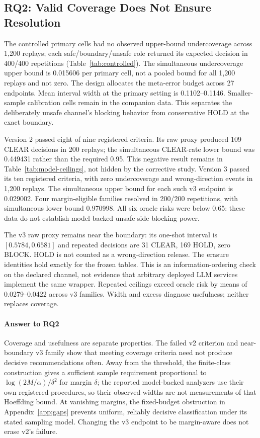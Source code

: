 \documentclass[conference,compsoc]{IEEEtran}
\begin{document}
\subsection{RQ2: Valid Coverage Does Not Ensure Resolution}
\ControlledTable
The controlled primary cells had no observed upper-bound undercoverage across
1,200 replays; each safe/boundary/unsafe role returned its expected decision in
400/400 repetitions (Table~\ref{tab:controlled}). The simultaneous
undercoverage upper bound is 0.015606 per primary cell, not a pooled bound
for all 1,200 replays and not zero. The design allocates the meta-error budget
across 27 endpoints. Mean interval width at the
primary setting is 0.1102--0.1146. Smaller-sample calibration cells remain in
the companion data. This separates the deliberately unsafe channel's blocking
behavior from conservative HOLD at the exact boundary.

\ModelCeilingTable
Version 2 passed eight of nine registered criteria. Its raw proxy produced
109 CLEAR decisions in 200 replays; the simultaneous CLEAR-rate lower bound
was 0.449431 rather than the required 0.95. This negative result remains in
Table~\ref{tab:model-ceilings}, not hidden by the corrective study. Version 3
passed its ten registered criteria, with zero undercoverage and wrong-direction
events in 1,200 replays. The simultaneous upper bound for each such v3 endpoint
is 0.029002. Four margin-eligible families resolved in 200/200 repetitions,
with simultaneous lower bound 0.970998. All six oracle risks were below 0.65:
these data do not establish model-backed unsafe-side blocking power.

The v3 raw proxy remains near the boundary: its one-shot interval is
$[0.5784,0.6581]$ and repeated decisions are 31 CLEAR, 169 HOLD, zero BLOCK.
HOLD is not counted as a wrong-direction release. The erasure identities hold
exactly for the frozen tables. This is an information-ordering check on the
declared channel, not evidence that arbitrary deployed LLM services implement
the same wrapper. Repeated ceilings exceed oracle risk by means of
0.0279--0.0422 across v3 families. Width and excess diagnose usefulness;
neither replaces coverage.

\paragraph{Answer to RQ2}
Coverage and usefulness are separate properties. The failed v2 criterion
and near-boundary v3 family show that meeting coverage criteria need not
produce decisive recommendations often. Away from the threshold, the finite-class construction gives
a sufficient sample requirement proportional to
$\log(2M/\alpha)/\delta^2$ for margin $\delta$; the reported model-backed
analyzers use their own registered procedures, so their observed widths are
not measurements of that Hoeffding bound. At vanishing margins, the
fixed-budget obstruction in Appendix~\ref{app:gaps} prevents uniform,
reliably decisive classification under its stated sampling model.
Changing the v3 endpoint to be margin-aware does not erase v2's failure.
\end{document}
